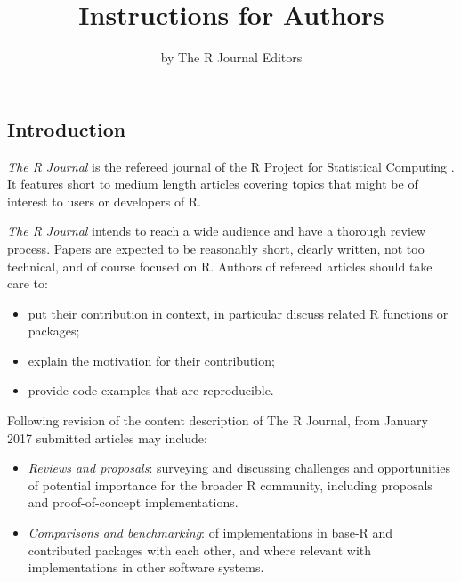 \documentclass[a4paper]{report}
\begin{document}
\fancyhf{}
\fancyhead[R]{\thepage}

\begin{article}
\title{Instructions for Authors}

\author{by The R Journal Editors}

\maketitle


\section{Introduction}

\emph{The R Journal} is the refereed journal of the R Project for Statistical
Computing \citep{ihaka:1996}.
It features short to medium length articles covering topics
that might be of interest to users or developers of R.

\emph{The R Journal} intends to reach a wide audience and have a 
thorough review process. Papers are expected to be reasonably short,
clearly written, not too technical, and of course focused on R. Authors 
of refereed articles should take care to:

\begin{itemize}
\item put their contribution in context, in particular discuss related R
  functions or packages; 
\item explain the motivation for their contribution;
\item provide code examples that are reproducible.
\end{itemize}

Following revision of the content description of The R Journal, 
from January 2017 submitted articles may include:

\begin{itemize}

\item \emph{Reviews and proposals}: surveying and discussing challenges and opportunities of potential importance for the broader R community, including proposals and proof-of-concept implementations.

\item \emph{Comparisons and benchmarking}: of implementations in base-R and contributed packages with each other, and where relevant with implementations in other software systems.


\end{itemize}
\end{article}
\end{document}
